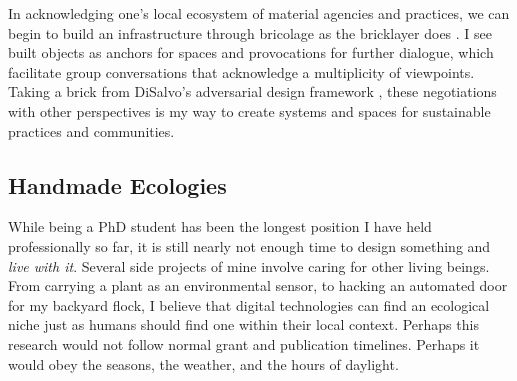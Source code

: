 In acknowledging one's local ecosystem of material agencies and practices, we can begin to build an infrastructure through bricolage as the bricklayer does \cite{turkle_epistemological_1990, vallgarda_interaction_2015}. I see built objects as anchors for spaces and provocations for further dialogue, which facilitate group conversations that acknowledge a multiplicity of viewpoints. Taking a brick from DiSalvo's adversarial design framework \cite{disalvo_adversarial_2012}, these negotiations with other perspectives is my way to create systems and spaces for sustainable practices and communities.

\subsection{Handmade Ecologies}

While being a PhD student has been the longest position I have held professionally so far, it is still nearly not enough time to design something and \textit{live with it}. Several side projects of mine involve caring for other living beings. From carrying a plant as an environmental sensor, to hacking an automated door for my backyard flock, I believe that digital technologies can find an ecological niche just as humans should find one within their local context. Perhaps this research would not follow normal grant and publication timelines. Perhaps it would obey the seasons, the weather, and the hours of daylight. 

